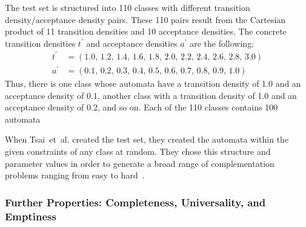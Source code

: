The \goal{} test set is structured into 110 classes with different transition density/acceptance density pairs. These 110 pairs result from the Cartesian product of 11 transition densities and 10 acceptance densities. The concrete transition densities $t^\prime$ and acceptance densities $a^\prime$ are the following:
\begin{align*}
t^\prime & = \left( 1.0,\,1.2,\,1.4,\,1.6,\,1.8,\,2.0,\,2.2,\,2.4,\,2.6,\,2.8,\,3.0 \right) \\
a^\prime & = \left( 0.1,\,0.2,\,0.3,\,0.4,\,0.5,\,0.6,\,0.7,\,0.8,\,0.9,\,1.0 \right)
\end{align*}
Thus, there is one class whose automata have a transition density of 1.0 and an acceptance density of 0.1, another class with a transition density of 1.0 and an acceptance density of 0.2, and so on. Each of the 110 classes contains 100 automata

When Tsai~et~al. created the \goal{} test set, they created the automata within the given constraints of any class at random. They chose this structure and parameter values in order to generate a broad range of complementation problems ranging from easy to hard~\cite{2011_tsai}.


\subsubsection{Further Properties: Completeness, Universality, and Emptiness}

